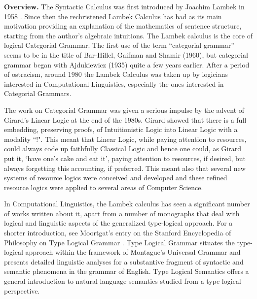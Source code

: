 \documentclass{lmcs}
\begin{document}
\textbf{Overview.} The Syntactic Calculus was first introduced by
Joachim Lambek in 1958 \cite{Lambek1958}. Since then the rechristened
Lambek Calculus has had as its main motivation providing an
explanation of the mathematics of sentence structure, starting from
the author's algebraic intuitions. The Lambek calculus is the core of
logical Categorial Grammar.  The first use of the term “categorial
grammar” seems to be in the title of Bar-Hillel, Gaifman and Shamir
(1960), but categorial grammar began with Ajdukiewicz (1935) quite a
few years earlier. After a period of ostracism, around 1980 the Lambek
Calculus was taken up by logicians interested in Computational
Linguistics, especially the ones interested in Categorial
Grammars. %

The work on Categorial Grammar was given a serious impulse by the
advent of Girard's Linear Logic  at the end of the 1980s.  Girard \cite{Girard:1987}
showed that there is a full embedding, preserving proofs, of
Intuitionistic Logic into Linear Logic with a modality ``!". This
meant that Linear Logic, while paying attention to resources, could
always code up faithfully Classical Logic and hence one could, as
Girard put it, `have one's cake and eat it', paying attention to
resources, if desired, but always forgetting this accounting, if
preferred. This meant also that several new
systems of resource logics were conceived and developed and these
refined resource logics were applied to several areas of Computer
Science.

In Computational Linguistics, the Lambek calculus 
has seen a significant number of works written
about it,  apart from a number of monographs that deal with
logical and linguistic aspects of the generalized type-logical
approach.  
For a shorter introduction, see Moortgat's entry on the Stanford Encyclopedia of Philosophy  on Type Logical Grammar \cite{MoortgatSEP}.
Type Logical Grammar situates the type-logical approach within the
framework of Montague's Universal Grammar and presents detailed
linguistic analyses for a substantive fragment of syntactic and
semantic phenomena in the grammar of English.  Type Logical Semantics offers a general introduction to natural language semantics studied from a type-logical perspective.
\end{document}
